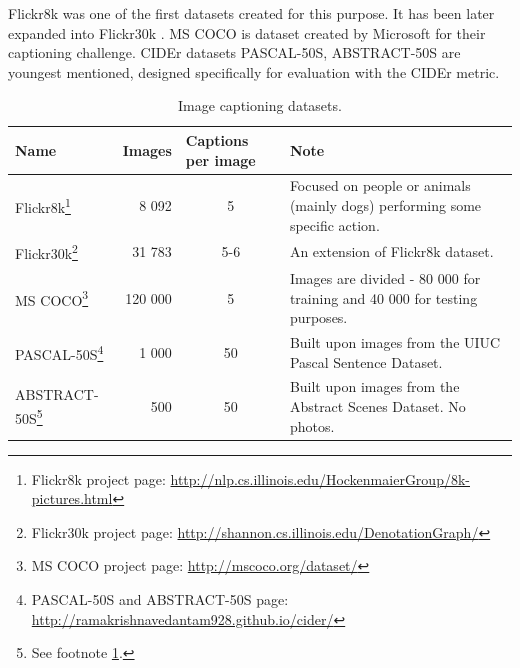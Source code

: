 Flickr8k \cite{dataset-flickr8k} was one of the first datasets created for this purpose. It has been later expanded into Flickr30k \cite{dataset-flickr30k}. MS COCO \cite{DBLP:journals/corr/ChenFLVGDZ15} is dataset created by Microsoft for their captioning challenge. CIDEr \cite{Vedantam_2015_CVPR} datasets PASCAL-50S, ABSTRACT-50S are youngest mentioned, designed specifically for evaluation with the CIDEr metric.

\def\arraystretch{1.2}%

\begin{center}
	\begin{longtable}{|l|m{2cm}|m{2cm}|m{4.7cm}|}			
		\caption{Image captioning datasets.} \label{tab:datasets} \\

	   	\hline
	   	\multicolumn{1}{|l|}{\textbf{Name}} & 
	   	\textbf{Images} & 
	   	\textbf{Captions per image} & 
	   	\textbf{Note} \\
	   	\hline \hline
		\endhead
		
	   	Flickr8k\footnote{Flickr8k project page: \url{http://nlp.cs.illinois.edu/HockenmaierGroup/8k-pictures.html}} &
		   	\multicolumn{1}{r|}{8 092} &
		   	\multicolumn{1}{c|}{5} &
		   	Focused on people or animals (mainly dogs) performing some specific action. \\ \hline
	   	Flickr30k\footnote{Flickr30k project page: \url{http://shannon.cs.illinois.edu/DenotationGraph/}} & 
		   	\multicolumn{1}{r|}{31 783} &
		   	\multicolumn{1}{c|}{5-6} &
		   	An extension of Flickr8k dataset. \\ \hline
	   	MS COCO\footnote{MS COCO project page: \url{http://mscoco.org/dataset/}} &
		   	\multicolumn{1}{r|}{120 000} &
		   	\multicolumn{1}{c|}{5} &
		   	Images are divided - 80 000 for training and 40 000 for testing purposes. \\ \hline
	   	PASCAL-50S\footnote{\label{ft:cider}PASCAL-50S and ABSTRACT-50S page: \url{http://ramakrishnavedantam928.github.io/cider/}} &
		   	\multicolumn{1}{r|}{1 000} &
		   	\multicolumn{1}{c|}{50} &
		   	Built upon images from the UIUC Pascal Sentence Dataset. \\ \hline
	   	ABSTRACT-50S\footnote{See footnote \ref{ft:cider}.} &
		   	\multicolumn{1}{r|}{500} &
		   	\multicolumn{1}{c|}{50} &
		   	Built upon images from the Abstract Scenes Dataset. No photos.\\ \hline
	\end{longtable}
\end{center}

